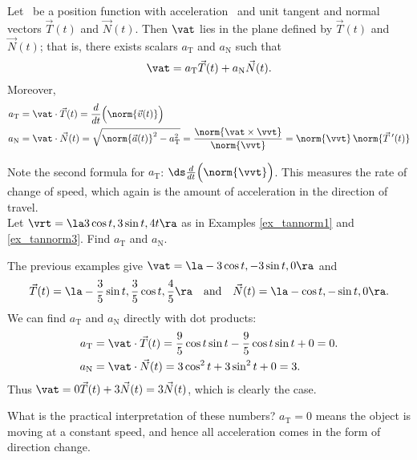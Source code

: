 \setboxwidth{20pt}
{Let \vrt\ be a position function with acceleration \vat\ and unit tangent and normal vectors $\vec T(t)$ and $\vec N(t)$. Then $\vat$ lies in the plane defined by $\vec T(t)$ and $\vec N(t)$; that is, there exists scalars $a_\text{T}$ and $a_\text{N}$ such that
\[
\vat = a_\text{T}\vec T(t) + a_\text{N}\vec N(t).
\]
Moreover,
\begin{align*}
a_\text{T} &= \vat\cdot\vec T(t) = \frac{d}{dt}\Big(\norm{\vec v(t)}\Big) \\
a_\text{N} &= \vat\cdot \vec N(t) = \sqrt{\norm{\vec a(t)}^2-a_\text{T}^2} = \frac{\norm{\vat\times\vvt}}{\norm{\vvt}} = \norm{\vvt}\,\norm{\vec T\,'(t)}
\end{align*}
}
\restoreboxwidth
{}

Note the second formula for $a_\text{T}$: $\ds \frac{d}{dt}\Big(\norm{\vvt}\Big)$. This measures the rate of change of speed, which again is the amount of acceleration in the direction of travel.\\

{Let $\vrt = \la 3\cos t, 3\sin t, 4t\ra$ as in Examples \ref{ex_tannorm1} and \ref{ex_tannorm3}. Find $a_\text{T}$ and $a_\text{N}$.}
{The previous examples give $\vat = \la -3\cos t,-3\sin t,0\ra$ and 
\[
\vec T(t) = \la -\frac35\sin t,\frac35\cos t,\frac45\ra \quad \text{and}\quad \vec N(t) = \la -\cos t,-\sin t,0\ra.
\]
We can find $a_\text{T}$ and $a_\text{N}$ directly with dot products:
\begin{align*}
a_\text{T} &= \vat\cdot \vec T(t) = \frac95\cos t\sin t-\frac95\cos t\sin t+0 = 0.\\
a_\text{N} &= \vat\cdot \vec N(t) = 3\cos^2t+3\sin^2t + 0 = 3.
\end{align*}
Thus $\vat = 0\vec T(t) + 3\vec N(t) = 3\vec N(t)$, which is clearly the case.

What is the practical interpretation of these numbers? $a_\text{T}=0$ means the object is moving at a constant speed, and hence all acceleration comes in the form of direction change.
}\\

